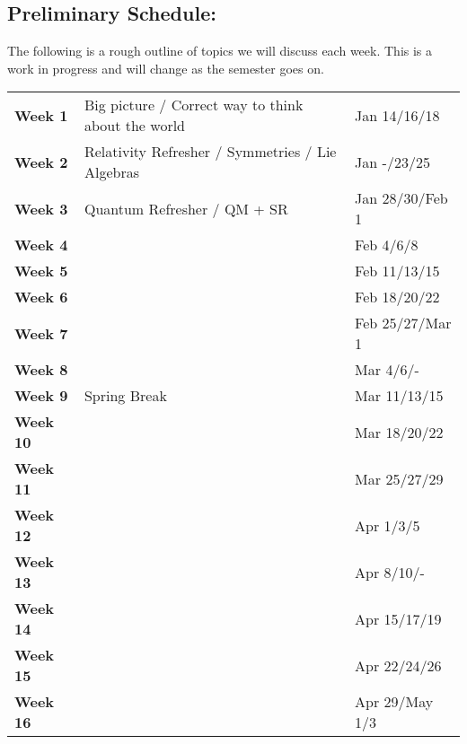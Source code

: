 \documentclass[margin,line]{res}
\begin{document}
\begin{resume}
\section{Preliminary Schedule:}

The following is a rough outline of topics we will discuss each week. 
This is a work in progress and will change as the semester goes on.

\begin{tabular}{lll}
\textbf{Week 1}  & Big picture / Correct way to think about the world & Jan 14/16/18 \\
\textbf{Week 2}  & Relativity Refresher / Symmetries /  Lie Algebras & Jan -/23/25 \\
\textbf{Week 3}  & Quantum Refresher / QM + SR   & Jan 28/30/Feb 1 \\
\textbf{Week 4}  &  & Feb 4/6/8\\
\textbf{Week 5}  &  & Feb 11/13/15\\
\textbf{Week 6}  &  & Feb 18/20/22\\
\textbf{Week 7}  &  & Feb 25/27/Mar 1\\
\textbf{Week 8}  &  & Mar 4/6/- \\
\textbf{Week 9}  & Spring Break & Mar 11/13/15\\
\textbf{Week 10} &  & Mar 18/20/22 \\
\textbf{Week 11} &  & Mar 25/27/29\\
\textbf{Week 12} &  & Apr 1/3/5\\
\textbf{Week 13} &  & Apr 8/10/-\\
\textbf{Week 14} &  & Apr 15/17/19\\
\textbf{Week 15} &  & Apr 22/24/26\\
\textbf{Week 16} &  & Apr 29/May 1/3\\
\end{tabular}

\end{resume}
\end{document}

